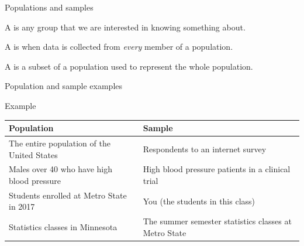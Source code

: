 \documentclass[xcolor=table]{beamer}
\begin{document}
\begin{frame}{Populations and samples}

\begin{block}{}
\large A  is any group that we are interested in knowing something about.
\end{block}

\pause
\begin{block}{}
\large A  is when data is collected from \emph{every} member of a population.
\end{block}

\pause
\begin{block}{}
\large A  is a subset of a population used to represent the whole population.
\end{block}

\end{frame}


\begin{frame}{Population and sample examples}

\begin{exampleblock}{Example}
\begin{center}
\begin{tabular}{p{1.8in} | p{1.8in} }
Population & Sample\\
\hline
The entire population of the United States & Respondents to an internet survey\pause\\ 
Males over 40 who have high blood pressure & High blood pressure patients in a clinical trial\pause\\

Students enrolled at Metro State in 2017 & You (the students in this class)\pause\\
Statistics classes in Minnesota & The summer semester statistics classes at Metro State\\
\end{tabular}
\end{center}
\end{exampleblock}

\end{frame}
\end{document}
